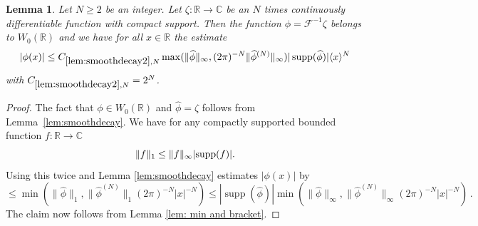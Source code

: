 \documentclass[12pt,reqno]{amsart}
\theoremstyle{plain}
\newtheorem{lemma}[theorem]{Lemma}
\numberwithin{equation}{section}
\theoremstyle{remark}
\newcommand{\using}[1]{}
\newcommand{\R}{{\mathbb R}}
\newcommand{\C}{{\mathbb C}}
\DeclareMathOperator{\supp}{supp}
\newcommand{\ct}[1]{{\color{magenta}{[C: #1]}}}
\newcommand{\jr}[1]{{\color{orange}{[J: #1]}}}
\begin{document}
\ct{I strengthened the following lemma by a factor $(2\pi)^N$ and improving the cosnatnt by a factor 2. The constant need no name, $2^N$ is shorter than the name.}\jr{I think the factor was probably omitted on purpose to simplify terms, see comment below}
\begin{lemma}
   \label{lem:smoothdecay2}\using{lem:smoothdecay}\using{lem: min and bracket}
Let $N\geq 2$ be an integer. Let $\zeta:\R\to\C$ be an $N$ times continuously differentiable function with compact support.
Then the function $\phi=\mathcal F^{-1} \zeta$ belongs to $W_0(\R)$ and we have for all $x\in \R$ the estimate
\begin{equation}\label{E:smoothdecay2}
|\phi(x)|\leq C_{\ref{lem:smoothdecay2}, N} \max(\|\widehat{\phi}\|_\infty, (2\pi )^{-N}\|\widehat{\phi}^{(N)}\|_\infty)|\supp (\widehat{\phi})|   \langle x\rangle^{N}
\end{equation}
with $C_{\ref{lem:smoothdecay2}, N}=2^{N} $.
\end{lemma}


\begin{proof}
The fact that $\phi \in W_0(\R)$ and $\widehat{\phi}=\zeta$ follows from Lemma~\ref{lem:smoothdecay}.
We have for any compactly supported bounded function $f:\R\to\C$
  \[\|f\|_1 \le \|f\|_\infty |\textup{supp}(f)| .\]
Using this twice and Lemma \ref{lem:smoothdecay} estimates $|\phi(x)|$ by
\[\le \min(\|\widehat{\phi}\|_1, \|\widehat{\phi}^{(N)}\|_1 (2\pi)^{-N} |x|^{-N})
\le |\supp (\widehat{\phi})| \min(\|\widehat{\phi}\|_\infty, \|\widehat{\phi}^{(N)}\|_\infty (2\pi)^{-N} |x|^{-N})\, . \]
  The claim now follows from Lemma \ref{lem: min and bracket}.
\end{proof}
\end{document}
